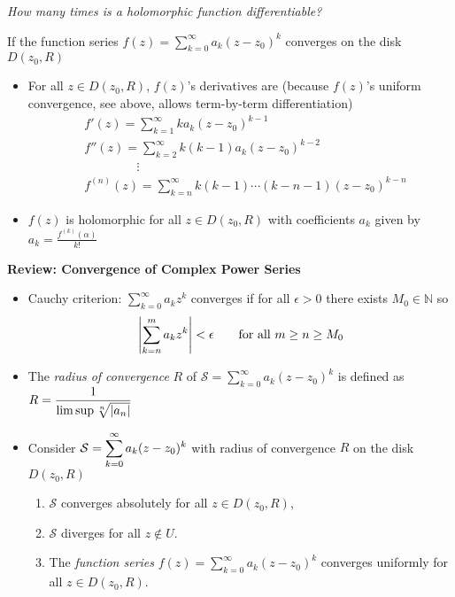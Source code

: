 \documentclass[11pt, a4paper]{article}
\begin{document}
	\textit{How many times is a holomorphic function differentiable?} 

If the function series $\displaystyle{f(z) = \sum_{k = 0}^{\infty} a_{k}(z - z_0)^{k}} $ converges on the disk $ D(z_0, R) $
\begin{itemize}
	\item For all $ z \in D(z_0, R) $,  $ f(z) $'s derivatives are (because $ f(z) $'s uniform convergence, see above, allows term-by-term differentiation)
	\begin{align*}
		&f'(z) = \sum_{k = 1}^{\infty}  k a_k (z - z_0)^{k-1}\\
		&f''(z) = \sum_{k = 2}^{\infty}  k (k-1) a_k (z - z_0)^{k-2}\\
		&\qquad \quad \quad \ \vdots\\
		&f^{(n)}(z) = \sum_{k = n}^{\infty}  k (k-1) \cdots (k - n - 1) (z - z_0)^{k-n}
	\end{align*}
	
	\item $ f(z) $ is holomorphic for all $ z \in D(z_0, R) $ with coefficients $ a_k  $ given by $ \displaystyle{	a_k = \frac{f^{(k)}(\alpha)}{k!}} $
	
\end{itemize}
\textbf{Review: Convergence of Complex Power Series}
\begin{itemize}
	\item Cauchy criterion: $\displaystyle{ \sum_{k = 0}^{\infty} a_{k}z^{k}} $ converges if for all $ \epsilon > 0 $ there exists $ M_0 \in \mathbb{N}$ so
	\begin{equation*}
		\abs{\sum_{k = n}^{m} a_k z^{k}} < \epsilon \qquad \text{for all } m \geq n \geq M_0
	\end{equation*}
	
	\item The \textit{radius of convergence} $ R $ of $\displaystyle{\mathcal{S} = \sum_{k = 0}^{\infty} a_{k}(z - z_0)^{k}} $ is defined as $ \displaystyle{R = \frac{1}{\limsup \sqrt[n]{\abs{a_n}}}} $
	
	\item Consider $\displaystyle{\mathcal{S} = \sum_{k = 0}^{\infty} a_{k}(z - z_0)^{k}} \vspace{0.5mm} $ with radius of convergence $ R $ on the  disk $ D(z_0, R) $
	\begin{enumerate}
		\item $ \mathcal{S} $ converges absolutely for all $ z \in D(z_0, R) $, 
		\item $ \mathcal{S} $ diverges for all $ z \notin U $.
		\item The \textit{function series} $ \displaystyle{f(z) = \sum_{k = 0}^{\infty} a_{k}(z - z_0)^{k}} $ converges uniformly for all $ z \in  D(z_0, R)$.
	\end{enumerate}
\end{itemize}
\end{document}
